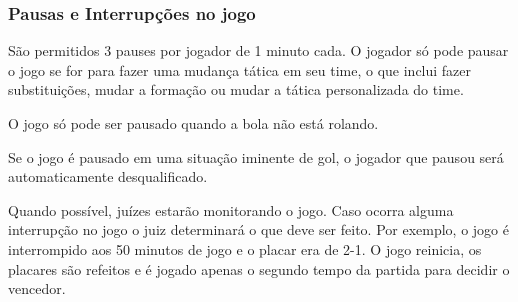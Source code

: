 \subsubsection{Pausas e Interrupções no jogo}

São permitidos 3 pauses por jogador de 1 minuto cada. O jogador só pode
pausar o jogo se for para fazer uma mudança tática em seu time, o que inclui
fazer substituições, mudar a formação ou mudar a tática personalizada do
time.

O jogo só pode ser pausado quando a bola não está rolando.

Se o jogo é pausado em uma situação iminente de gol, o jogador que pausou
será automaticamente desqualificado.

Quando possível, juízes estarão monitorando o jogo. Caso ocorra alguma
interrupção no jogo o juiz determinará o que deve ser feito. Por exemplo, o
jogo é interrompido aos 50 minutos de jogo e o placar era de 2-1. O jogo
reinicia, os placares são refeitos e é jogado apenas o segundo tempo da
partida para decidir o vencedor.